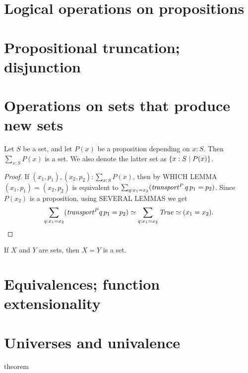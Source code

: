 \section{Logical operations on propositions}

\section{Propositional truncation; disjunction}

\section{Operations on sets that produce new sets}

\begin{lemma}\label{lem:subset}
Let $S$ be a set, and let $P(x)$ be a proposition depending on $x:S$. 
Then $\sum_{x:S} P(x)$ is a set. We also denote the latter set
as $\{x:S \mid P(x)\}$.
\end{lemma}

\begin{proof}
If $(x_1,p_1),(x_2,p_2) : \sum_{x:S} P(x)$, then by WHICH LEMMA
$(x_1,p_1)=(x_2,p_2)$ is equivalent to 
$\sum_{q:x_1=x_2} (\mathop{\mathit{transport}}^P q\,p_1 = p_2)$. 
Since $P(x_2)$ is a proposition, using SEVERAL LEMMAS we get 
\[
\sum_{q:x_1=x_2} ({\mathop{\mathit{transport}}}^P q\,p_1 = p_2) \simeq 
\sum_{q:x_1=x_2} \mathop{\mathit{True}} \simeq (x_1=x_2).
\]

\end{proof}

\begin{lemma}\label{lem:eq_of_sets_is set}
If $X$ and $Y$ are sets, then $X=Y$ is a set.
\end{lemma}




\section{Equivalences; function extensionality}

\section{Universes and univalence}

\begin{theorem} theorem \end{theorem}

